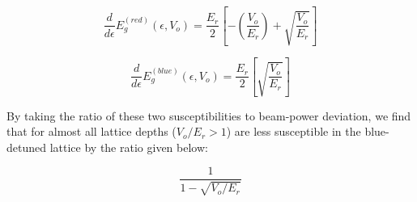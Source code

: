 \begin{equation}
\frac{d}{d \epsilon}E_g^{(red)}(\epsilon, V_o) = \frac{E_r}{2} \left [ - \left ( \frac{V_o}{E_r} \right ) + \sqrt{\frac{V_o}{E_r}} \right ]
\end{equation}

\begin{equation}
\frac{d}{d \epsilon}E_g^{(blue)}(\epsilon, V_o) = \frac{E_r}{2} \left [ \sqrt{\frac{V_o}{E_r}} \right ]
\end{equation}


By taking the ratio of these two susceptibilities to beam-power deviation, we find that for almost all lattice depths ($V_o/E_r >1$) are less susceptible in the blue-detuned lattice by the ratio given below:

\[
\frac{1}{1-\sqrt{V_o/E_r}}
\]